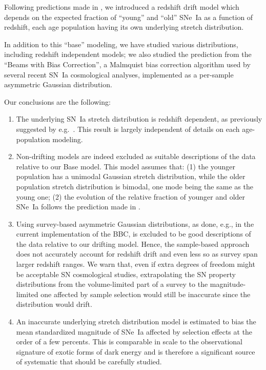 \documentclass[]{aa} %
\newcommand{\mr}[1]{{\textcolor[rgb]{0.60,0.10,0.6}{#1}}}
\newcommand{\nn}[1]{{\textcolor[rgb]{0.25, 0.50, 0}{#1}}}
\begin{document}
Following predictions made in \cite{rigault2018}, we introduced a redshift drift
model which depends on the expected fraction of ``young'' and ``old'' SNe~Ia as
a function of redshift, each age population having its own underlying
stretch distribution.

In addition to this ``base'' modeling, we have studied various distributions,
including redshift independent models; we also studied the prediction from the
``Beams with Bias Correction'', a Malmquist bias correction algorithm used by
\nn{several} recent SN~Ia cosmological analyses, implemented as a per-sample
asymmetric Gaussian distribution.

Our conclusions are the following:
\begin{enumerate}

    \item The underlying SN~Ia stretch distribution is         redshift dependent, as previously suggested by e.g.~\cite{howell2007}. This
        result is largely independent of details on each age-population
        modeling.

    \item Non-drifting models are indeed excluded as \nn{suitable} descriptions of the
        data \nn{relative to} our Base model. This model assumes
        that: (1) the younger population has a unimodal Gaussian stretch
        distribution, while the older population stretch distribution
        is bimodal, one mode being the same as the young one; (2) the
        evolution of the relative fraction of younger and older SNe~Ia
        follows the prediction made in \cite{rigault2018}. 

    
    \item 
        \mr{Using} survey-based asymmetric Gaussian distributions, as  done, e.g., in the current implementation of the BBC, is excluded to be good descriptions of the data \nn{relative to} our drifting model. Hence, the sample-based approach does not accurately account for redshift drift and even less so as survey span larger redshift ranges. \mr{We warn that, even if extra degrees of freedom might be acceptable SN cosmological studies, extrapolating the SN property distributions from the volume-limited part of a survey to the magnitude-limited one affected by sample selection would still be inaccurate since the distribution would drift.}

    \item An inaccurate underlying stretch distribution model is estimated to
        bias the mean standardized magnitude of SNe~Ia affected \nn{by}
        selection effects at the order of a few percents. This is
        comparable in scale to the observational signature of exotic forms of
        dark energy and is therefore a significant source of systematic that
        should be carefully studied.


\end{enumerate}
\end{document}
